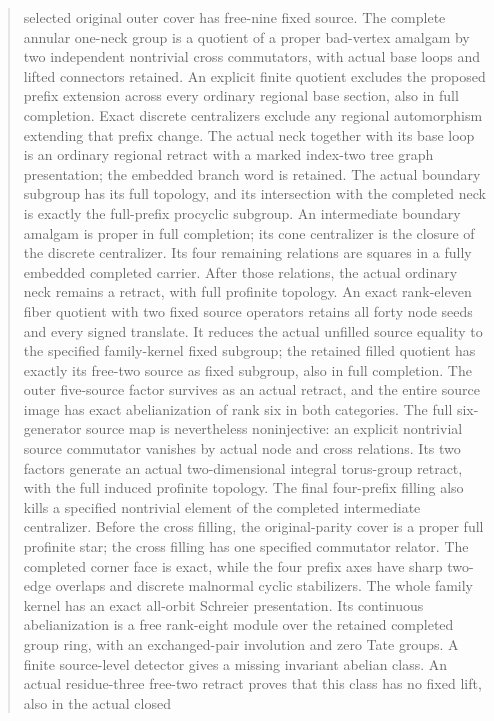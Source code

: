 \documentclass[11pt,a4paper]{article}
\begin{document}
\begin{abstract}
selected original outer cover has free-nine fixed source. The complete
annular one-neck group is a quotient of a proper bad-vertex amalgam by
two independent nontrivial cross commutators, with actual base loops
and lifted connectors retained. An explicit finite quotient excludes the proposed prefix extension
across every ordinary regional base section, also in full completion.
Exact discrete centralizers exclude any regional automorphism extending
that prefix change. The actual neck together with its base loop is an
ordinary regional retract with a marked index-two tree graph presentation;
the embedded branch word is retained. The actual boundary subgroup
has its full topology, and its intersection with the completed neck is
exactly the full-prefix procyclic subgroup. An intermediate boundary
amalgam is proper in full completion; its cone centralizer is the closure
of the discrete centralizer. Its four remaining relations are squares
in a fully embedded completed carrier. After those relations, the actual
ordinary neck remains a retract, with full profinite topology. An exact
rank-eleven fiber quotient with two fixed source operators retains all
forty node seeds and every signed translate. It reduces the actual
unfilled source equality to the specified family-kernel fixed subgroup;
the retained filled quotient has exactly its free-two source as fixed
subgroup, also in full completion. The outer five-source factor survives
as an actual retract, and the entire source image has exact abelianization
of rank six in both categories. The full six-generator source map is
nevertheless noninjective: an explicit nontrivial source commutator
vanishes by actual node and cross relations. Its two factors generate
an actual two-dimensional integral torus-group retract, with the full
induced profinite topology. The final four-prefix filling also kills a
specified nontrivial element of the completed intermediate centralizer.
Before the cross filling, the original-parity cover is a proper full
profinite star; the cross filling has one specified commutator relator.
The completed corner face is exact, while the four prefix axes have
sharp two-edge overlaps and discrete malnormal cyclic stabilizers.
The whole family kernel has an exact all-orbit Schreier presentation.
Its continuous abelianization is a free rank-eight module over the
retained completed group ring, with an exchanged-pair involution and
zero Tate groups. A finite source-level detector gives a missing
invariant abelian class. An actual residue-three free-two retract
proves that this class has no fixed lift, also in the actual closed

\end{abstract}
\end{document}
